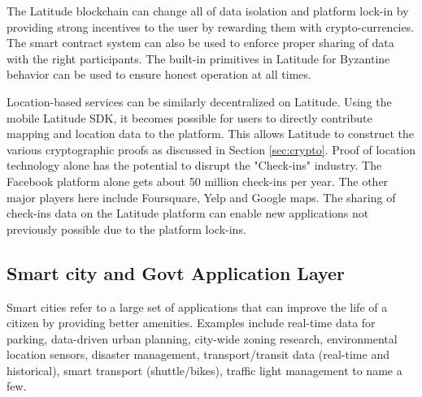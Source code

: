 The Latitude blockchain can change all of data isolation and platform lock-in by providing strong incentives to the user
by rewarding them with crypto-currencies. The smart contract system can also be used to enforce proper sharing of data
with the right participants. The built-in primitives in Latitude for Byzantine behavior can be used to ensure honest
operation at all times.

Location-based services can be similarly decentralized on Latitude. Using the mobile Latitude SDK, it becomes possible
for users to directly contribute mapping and location data to the platform. This allows Latitude to construct the
various cryptographic proofs as discussed in Section \ref{sec:crypto}. Proof of location technology alone has the
potential to disrupt the "Check-ins" industry. The Facebook platform alone gets about 50 million check-ins per year. The
other major players here include Foursquare, Yelp and Google maps. The sharing of check-ins data on the Latitude
platform can enable new applications not previously possible due to the platform lock-ins.

%
%
%
%
\subsection{Smart city and Govt Application Layer}

Smart cities refer to a large set of applications that can improve the life of a citizen by providing better amenities.
Examples include real-time data for parking, data-driven urban planning, city-wide zoning research,
environmental location sensors, disaster management, transport/transit data (real-time and historical), smart transport
(shuttle/bikes), traffic light management to name a few.

